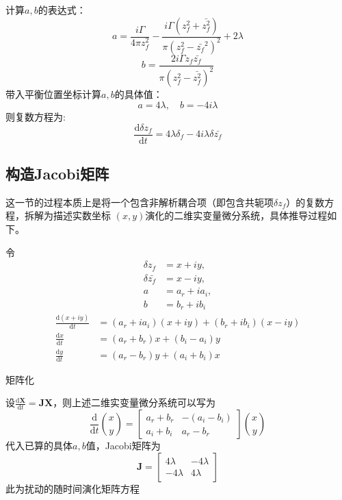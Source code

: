 计算$a,b$的表达式：
\[
a=\frac{i\Gamma}{4\pi z_{f}^{2}}-\frac{i\Gamma(z_{f}^{2}+\bar{z_{f}^{2}})}{\pi(z_{f}^{2}-\bar{z_{f}}^{2})^{2}}+2\lambda
\]
\[
b=\frac{2i\Gamma z_{f}\bar{z_{f}}}{\pi(z_{f}^{2}-\bar{z_{f}^{2}})^{2}}
\]
带入平衡位置坐标计算$a,b$的具体值：
\[
a=4\lambda, \quad b=-4i\lambda
\]
则复数方程为:
\[
\frac{\mathrm{d}\delta z_{f}}{\mathrm{d}t}=4\lambda \delta_{f}-4i\lambda \delta \bar{z_{f}}
\]

\subsection{构造Jacobi矩阵}
这一节的过程本质上是将一个包含非解析耦合项（即包含共轭项$\delta z_{f}$）的复数方程，拆解为描述实数坐标 $(x, y)$演化的二维实变量微分系统，具体推导过程如下。

令
\begin{align*}
    \delta z_{f}&=x+iy,\\
    \delta \bar{z_{f}}&=x-iy,\\
    a&=a_{r}+ia_{i}, \\
    b&=b_{r}+ib_{i}
\end{align*}
\begin{align*}
    \frac{\mathrm{d}(x+iy)}{\mathrm{d}t}&=(a_{r}+ia_{i})(x+iy)+(b_{r}+ib_{i})(x-iy)\\
    \frac{\mathrm{d}x}{\mathrm{d}t}&=(a_{r}+b_{r})x+(b_{i}-a_{i})y\\
    \frac{\mathrm{d}y}{\mathrm{d}t}&=(a_{r}-b_{r})y+(a_{i}+b_{i})x
\end{align*}

矩阵化

设$\frac{\mathrm{d}\mathbf{X}}{\mathrm{d}t}=\mathbf{JX}$，则上述二维实变量微分系统可以写为
\[
\frac{\mathrm{d}}{\mathrm{d}t}\binom{x}{y}=\begin{bmatrix}
    a_{r}+b_{r} & -(a_{i}-b_{i}) \\
    a_{i}+b_{i} & a_{r}-b_{r}
\end{bmatrix}
\binom{x}{y}
\]
代入已算的具体$a,b$值，Jacobi矩阵为
\[
\mathbf{J}=
\begin{bmatrix}
    4\lambda & -4\lambda \\
    -4\lambda & 4\lambda
\end{bmatrix}
\]
此为扰动的随时间演化矩阵方程
